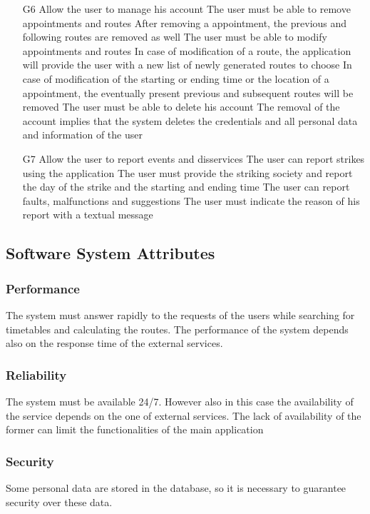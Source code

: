 \begin{itemize}
	\item[G6] Allow the user to manage his account
	\subitem[G6.1] The user must be able to remove appointments and routes
	\subsubitem[R6.1.1]After removing a appointment, the previous and following routes are removed as well
	\subitem[G6.2] The user must be able to modify appointments and routes
	\subsubitem[R6.2.1]In case of modification of a route, the application will provide the user with a new list of newly generated routes to choose
	\subsubitem[R6.2.2]In case of modification of the starting or ending time or the location of a appointment, the eventually present previous and subsequent routes will be removed
	\subitem[G6.3] The user must be able to delete his account
	\subsubitem[R6.3.1]The removal of the account implies that the system deletes the credentials and all personal data and information of the user
	\item[G7] Allow the user to report events and disservices 
	\subitem[G7.1] The user can report strikes using the application
	\subsubitem[R7.1.1]The user must provide the striking society and report the day of the strike and the starting and ending time
	\subitem[G7.2] The user can report faults, malfunctions and suggestions
	\subsubitem[R7.2.1]The user must indicate the reason of his report with a textual message
	
\end{itemize}



\subsection{Software System Attributes}
\subsubsection{Performance}
The system must answer rapidly to the requests of the users while searching for timetables and calculating the routes. The performance of the system depends also on the response time of the external services.

\subsubsection{Reliability}
The system must be available 24/7. However also in this case the availability of the service depends on the one of external services. The lack of availability of the former can limit the functionalities of the main application
\subsubsection{Security}
Some personal data are stored in the database, so it is necessary to guarantee security over these data.
